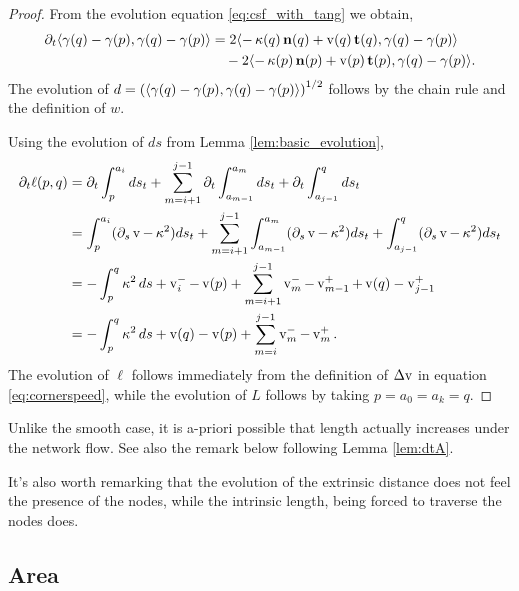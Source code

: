 \documentclass[12pt]{amsart}
\begin{document}
\begin{proof}
From the evolution equation \eqref{eq:csf_with_tang} we obtain,
\[
\begin{split}
\partial_t \langle{\gamma(q) - \gamma(p)},{\gamma(q) - \gamma(p)}\rangle &= 2 \langle{-\operatorname{\kappa}(q) \operatorname{\mathbf{n}}(q) + \operatorname{v}(q) \operatorname{\mathbf{t}}(q)},{\gamma(q) - \gamma(p)}\rangle \\
&\quad  - 2 \langle{-\operatorname{\kappa}(p) \operatorname{\mathbf{n}}(p) + \operatorname{v}(p) \operatorname{\mathbf{t}}(p)},{\gamma(q) - \gamma(p)}\rangle.
\end{split}
\]
The evolution of \(d = \left(\langle{\gamma(q) - \gamma(p)},{\gamma(q) - \gamma(p)}\rangle\right)^{1/2}\) follows by the chain rule and the definition of \(w\).

Using the evolution of \(ds\) from Lemma \ref{lem:basic_evolution},
\begin{align*}
\partial_t \ell(p,q) &= \partial_t \int_p^{a_i} ds_t + \sum_{m=i+1}^{j-1} \partial_t \int_{a_{m-1}}^{a_m} ds_t + \partial_t  \int_{a_{j-1}}^q ds_t \\
&= \int_p^{a_i} (\partial_s \operatorname{v} - \operatorname{\kappa}^2 )ds_t + \sum_{m=i+1}^{j-1} \int_{a_{m-1}}^{a_m} (\partial_s \operatorname{v} - \operatorname{\kappa}^2 )ds_t + \int_{a_{j-1}}^q (\partial_s \operatorname{v} - \operatorname{\kappa}^2) ds_t \\
&= -\int_p^q \operatorname{\kappa}^2 ds + \operatorname{v}_i^- - \operatorname{v}(p) + \sum_{m=i+1}^{j-1} \operatorname{v}_m^- - \operatorname{v}_{m-1}^+ + \operatorname{v}(q) - \operatorname{v}_{j-1}^+ \\
&= -\int_p^q \operatorname{\kappa}^2 ds + \operatorname{v}(q) - \operatorname{v}(p) + \sum_{m=i}^{j-1} \operatorname{v}_m^- - \operatorname{v}_m^+.
\end{align*}
The evolution of \(\ell\) follows immediately from the definition of \(\operatorname{{\Delta v}}\) in equation \eqref{eq:cornerspeed}, while the evolution of \(L\) follows by taking \(p=a_0=a_k=q\).
\end{proof}

\begin{remark}
Unlike the smooth case, it is a-priori possible that length actually increases under the network flow. See also the remark below following Lemma \ref{lem:dtA}.
\end{remark}

It's also worth remarking that the evolution of the extrinsic distance does not feel the presence of the nodes, while the intrinsic length, being forced to traverse the nodes does.

\subsection{Area}
\label{subsec:A}
\end{document}

